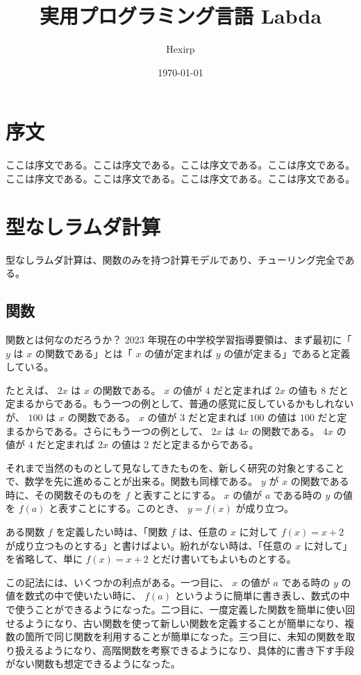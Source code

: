 \documentclass[book]{jlreq}
\title{実用プログラミング言語 Labda}
\author{Hexirp}
\date{\today}
\newcommand{\p}[1]{ \mathord{ \left( #1 \right) } }
\begin{document}
\maketitle

\chapter*{序文}

ここは序文である。ここは序文である。ここは序文である。ここは序文である。ここは序文である。ここは序文である。ここは序文である。ここは序文である。

\chapter{型なしラムダ計算}

型なしラムダ計算は、関数のみを持つ計算モデルであり、チューリング完全である。

\section{関数}

関数とは何なのだろうか？ 2023 年現在の中学校学習指導要領は、まず最初に「 \( y \) は \( x \) の関数である」とは「 \( x \) の値が定まれば \( y \) の値が定まる」であると定義している。

たとえば、 \( 2 x \) は \( x \) の関数である。 \( x \) の値が \( 4 \) だと定まれば \( 2 x \) の値も \( 8 \) だと定まるからである。もう一つの例として、普通の感覚に反しているかもしれないが、 \( 100 \) は \( x \) の関数である。 \( x \) の値が \( 3 \) だと定まれば \( 100 \) の値は \( 100 \) だと定まるからである。さらにもう一つの例として、 \( 2 x \) は \( 4 x \) の関数である。 \( 4 x \) の値が \( 4 \) だと定まれば \( 2 x \) の値は \( 2 \) だと定まるからである。

それまで当然のものとして見なしてきたものを、新しく研究の対象とすることで、数学を先に進めることが出来る。関数も同様である。 \( y \) が \( x \) の関数である時に、その関数そのものを \( f \) と表すことにする。 \( x \) の値が \( a \) である時の \( y \) の値を \( f \p{ a } \) と表すことにする。このとき、 \( y = f \p{ x } \) が成り立つ。

ある関数 \( f \) を定義したい時は、「関数 \( f \) は、任意の \( x \) に対して \( f \p{ x } = x + 2 \) が成り立つものとする」と書けばよい。紛れがない時は、「任意の \( x \) に対して」を省略して、単に \( f \p{ x } = x + 2 \) とだけ書いてもよいものとする。

この記法には、いくつかの利点がある。一つ目に、 \( x \) の値が \( a \) である時の \( y \) の値を数式の中で使いたい時に、 \( f \p{ a } \) というように簡単に書き表し、数式の中で使うことができるようになった。二つ目に、一度定義した関数を簡単に使い回せるようになり、古い関数を使って新しい関数を定義することが簡単になり、複数の箇所で同じ関数を利用することが簡単になった。三つ目に、未知の関数を取り扱えるようになり、高階関数を考察できるようになり、具体的に書き下す手段がない関数も想定できるようになった。
\end{document}
